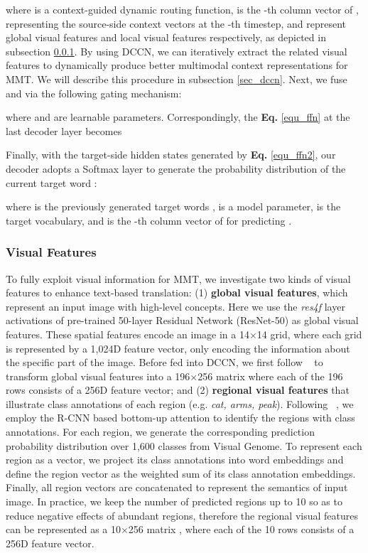 \documentclass[sigconf]{acmart}
\begin{document}
where  is a context-guided dynamic routing function,  is the -th column vector of , representing the source-side context vectors at the -th timestep,   and  represent global visual features and local visual features respectively, as depicted in subsection \ref{sec_visual_features}. 
By using DCCN, we can iteratively extract the related visual features to dynamically produce better multimodal context representations for MMT. We will describe this procedure in subsection \ref{sec_dccn}. 
Next, we fuse  and  via the following gating mechanism: 

where  and  are learnable parameters. 
Correspondingly, the \textbf{Eq.} \ref{equ_ffn} at the last decoder layer becomes 


Finally, with the target-side hidden states generated by \textbf{Eq.} \ref{equ_ffn2}, 
our decoder adopts a Softmax layer to generate the probability distribution of the current target word :

where  is the previously generated target words ,  is a model parameter,  is the target vocabulary, 
and  is the -th column vector of  for predicting .

\subsubsection{Visual Features}\label{sec_visual_features}
To fully exploit visual information for MMT, we investigate two kinds of visual features to enhance text-based translation: 
(1) \textbf{global visual features}, which represent an input image with high-level concepts. Here we use the \textit{res4f} layer activations of pre-trained 50-layer Residual Network (ResNet-50)\cite{resnet} as global visual features. These spatial features encode an image in a 14×14 grid, where each grid is represented by a 1,024D feature vector, only encoding the information about the specific part of the image. 
Before fed into DCCN, we first follow \citeauthor{calixto2017doubly}~ to transform global visual features into a 196×256 matrix  
where each of the 196 rows consists of a 256D feature vector; and 
(2) \textbf{regional visual features} that illustrate class annotations of each region (e.g. \emph{cat, arms, peak}). 
Following \citeauthor{bottom-up-attention}~, we employ the R-CNN based bottom-up attention to identify the regions with class annotations. 
For each region, we generate the corresponding prediction probability distribution over 1,600 classes from Visual Genome. 
To represent each region as a vector, we project its class annotations into word embeddings and define the region vector as the weighted sum of its class annotation embeddings. Finally, all region vectors are concatenated to represent the semantics of input image. In practice, we keep the number of predicted regions up to 10 so as to reduce negative effects of abundant regions, therefore the regional visual features can be represented as a 10×256 matrix ,  where each of the 10 rows consists of a 256D feature vector.
\end{document}
